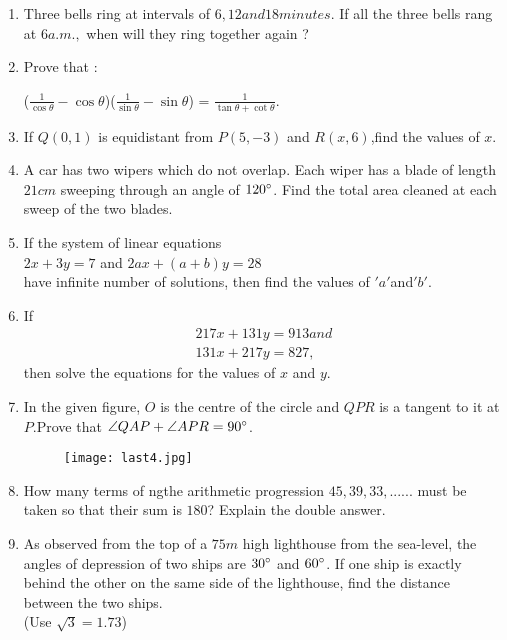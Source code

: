 \documentclass{article}
\begin{document}
\begin{enumerate}
\item Three bells ring at intervals of $ 6, 12 and 18 minutes$. If all the three bells rang at $ 6 a.m.,$ when will they ring together again ?

\item Prove that :
	\begin{center}
	($\frac{1}{\cos\theta}-\cos\theta$)($\frac{1}{\sin\theta}-\sin\theta$) = $\frac{1}{\tan\theta + \cot\theta}$.
	\end{center}

\item If $Q(0,1)$ is equidistant from $P(5,-3)$ and $R(x,6)$,find the values of $x$.	

\item A car has two wipers which do not overlap. Each wiper has a blade of length $21 cm$ sweeping through an angle of $120\degree$. Find the total area cleaned at each sweep of the two blades.

\item If the system of linear equations  \\ 		
         $2x + 3y = 7$ and $2ax + (a+b)y = 28$ \\
\text have infinite number of solutions, then find the values of $' a '$and$' b '$.

\item If
\begin{align}
	 217x + 131y = 913 and \\
         131x + 217y = 827,
\end{align}
 then solve the equations for the values of $x$ and $y$.

\item In the given figure, $O$ is the centre of the circle and $QPR$ is a tangent to it at $P$.Prove that $\angle QAP + \angle APR = 90\degree$.

	\begin{figure}[!ht]
		\centering
		\texttt{[image: last4.jpg]}
		\caption{}
		\label{fig:enter-label}
	\end{figure}

\item How many terms of ngthe arithmetic progression $45,39,33,......$ must be taken so that their sum is $180$? Explain the double answer.

\item As observed from the top of a $75 m$ high lighthouse from the sea-level, the angles of depression of two ships are $30\degree$ and $60\degree$. If one ship is exactly behind the other on the same side of the lighthouse, find the distance between the two ships.\\
	(Use $\sqrt{3} = 1.73$)


\end{enumerate}
\end{document}
